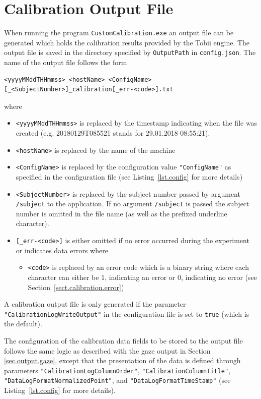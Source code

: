 \documentclass[a4paper,oneside]{book}
\begin{document}
\section{Calibration Output File}
When running the program \texttt{CustomCalibration.exe} an output file can be generated which holds the calibration results provided by the Tobii engine.
The output file is saved in the directory specified by \texttt{OutputPath} in \texttt{config.json}.
The name of the output file follows the form
\begin{lstlisting}
<yyyyMMddTHHmmss>_<hostName>_<ConfigName>[_<SubjectNumber>]_calibration[_err-<code>].txt
\end{lstlisting}
where
\begin{itemize}
    \item \texttt{<yyyyMMddTHHmmss>} is replaced by the timestamp indicating when the file was created (e.g. 20180129T085521 stands for 29.01.2018 08:55:21).
    \item \texttt{<hostName>} is replaced by the name of the machine
    \item \texttt{<ConfigName>} is replaced by the configuration value \texttt{"ConfigName"} as specified in the configuration file (see Listing~\ref{lst.config} for more details)
    \item \texttt{<SubjectNumber>} is replaced by the subject number passed by argument \texttt{/subject} to the application.
        If no argument \texttt{/subject} is passed the subject number is omitted in the file name (as well as the prefixed underline character).
    \item \texttt{[\_err-<code>]} is either omitted if no error occurred during the experiment or indicates data errors where
        \begin{itemize}
            \item \texttt{<code>} is replaced by an error code which is a binary string where each character can either be 1, indicating an error or 0, indicating no error (see Section~\ref{sect.calibration.error})
        \end{itemize}
\end{itemize}

A calibration output file is only generated if the parameter \texttt{"CalibrationLogWriteOutput"} in the configuration file is set to \texttt{true} (which is the default).

The configuration of the calibration data fields to be stored to the output file follows the same logic as described with the gaze output in Section \ref{sec.output.gaze}, except that the presentation of the data is defined through parameters \texttt{"CalibrationLogColumnOrder"}, \texttt{"CalibrationColumnTitle"}, \texttt{"DataLogFormatNormalizedPoint"}, and \texttt{"DataLogFormatTimeStamp"} (see Listing~\ref{lst.config} for more details).
\end{document}
